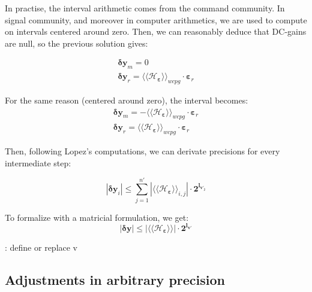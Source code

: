 		In practise, the interval arithmetic comes from the command community.
		In signal community, and moreover in computer arithmetics, we are used to compute on intervals centered around zero.
		Then, we can reasonably deduce that DC-gains are null, so the previous solution gives:

		\begin{eqnarray} \label{eqprec}
			\boldsymbol{\delta y}_m = 0 \\
			\boldsymbol{\delta y}_r = \langle\langle \mathcal{H}_{\boldsymbol{\varepsilon}} \rangle\rangle_{wcpg} \cdot \boldsymbol{\varepsilon}_r
		\end{eqnarray}

		For the same reason (centered around zero), the interval becomes:
		\begin{eqnarray} \label{eqprec}
			\boldsymbol{\delta y}_m = -\langle\langle \mathcal{H}_{\boldsymbol{\varepsilon}} \rangle\rangle_{wcpg} \cdot \boldsymbol{\varepsilon}_r \\
			\boldsymbol{\delta y}_r = \langle\langle \mathcal{H}_{\boldsymbol{\varepsilon}} \rangle\rangle_{wcpg} \cdot \boldsymbol{\varepsilon}_r
		\end{eqnarray}

		Then, following Lopez's computations, we can derivate precisions for every intermediate step:
		
		\begin{equation}
			|\boldsymbol{\delta y}_i| \leq \sum_{j=1}^{n'} | \langle\langle \mathcal{H}_{\boldsymbol{\varepsilon}} \rangle\rangle_{i,j}| \cdot \boldsymbol{2^{l_{v'_j}}}
		\end{equation}

		To formalize with a matricial formulation, we get:
		\begin{equation}
			|\boldsymbol{\delta y}| \leq | \langle\langle \mathcal{H}_{\boldsymbol{\varepsilon}} \rangle\rangle| \cdot \boldsymbol{2^{l_{v'}}}
		\end{equation}

		\TODO: define or replace v









	\subsection{Adjustments in arbitrary precision}

	






